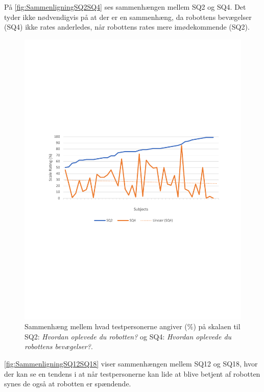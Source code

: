 På \autoref{fig:SammenligningSQ2SQ4} ses sammenhængen mellem SQ2 og SQ4. Det tyder ikke nødvendigvis på at der er en sammenhæng, da robottens bevægelser (SQ4) ikke rates anderledes, når robottens rates mere imødekommende (SQ2).
%
\begin{figure}[H]
	\centering
	\includegraphics[width=\textwidth]{Figure/Korrelationsgrafer/SQ2+SQ4}
	\caption{Sammenhæng mellem hvad testpersonerne angiver (\%) på skalaen til SQ2: \textit{Hvordan oplevede du robotten?} og SQ4: \textit{Hvordan oplevede du robottens bevægelser?}.}
	\label{fig:SammenligningSQ2SQ4}
\end{figure}
\noindent
%
\autoref{fig:SammenligningSQ12SQ18} viser sammenhængen mellem SQ12 og SQ18, hvor der kan se en tendens i at når testpersonerne kan lide at blive betjent af robotten synes de også at robotten er spændende. 
%
